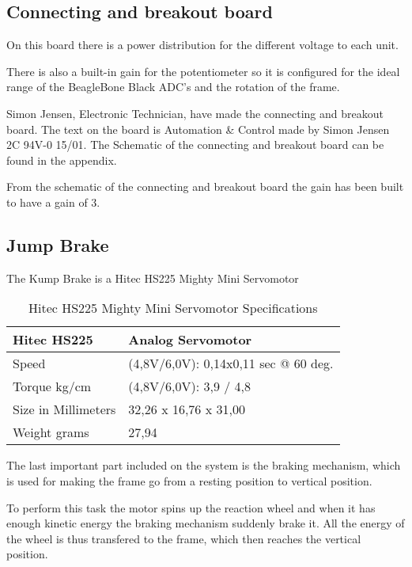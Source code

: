 \subsection{Connecting and breakout board}
On this board there is a power distribution for the different voltage to each unit.

There is also a built-in gain for the potentiometer so it is configured for the ideal range of the BeagleBone Black ADC's and the rotation of the frame. 

Simon Jensen, Electronic Technician, have made the connecting and breakout board. The text on the board is Automation \& Control made by Simon Jensen 2C 94V-0 15/01. The Schematic of the connecting and breakout board can be found in the appendix.

From the schematic of the connecting and breakout 
board the gain has been built to have a gain of 3.  


\subsection{Jump Brake}
The Kump Brake is a Hitec HS225 Mighty Mini Servomotor

\begin{table}[H]
	\centering
	\begin{tabular}{|p{4cm}|p{7cm}|}
		\hline%
		Hitec HS225                & Analog Servomotor   \\
		\hline%
		Speed                    &  (4,8V/6,0V): 0,14x0,11 sec @ 60 deg.  	\\
		\hline%
		Torque kg/cm                    &  (4,8V/6,0V): 3,9 / 4,8  	\\
		\hline%
		Size in Millimeters 							 &  32,26 x 16,76 x 31,00    \\
		\hline%
		Weight grams      &  27,94    \\
		\hline%
	\end{tabular}
	\caption{Hitec HS225 Mighty Mini Servomotor Specifications}
	\label{HitecHS225Servomotor}
\end{table}


The last important part included on the system is the braking mechanism, which is used for making the frame go from a resting position to vertical position. 

To perform this task the motor spins up the reaction wheel and when it has enough kinetic energy the braking mechanism suddenly brake it. All the energy of the wheel is thus transfered to the frame, which then reaches the vertical position.
